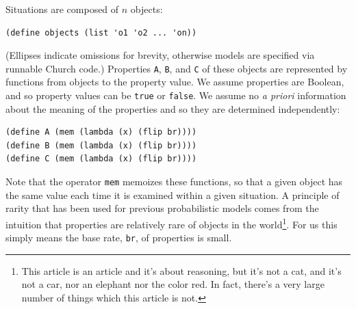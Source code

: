 \documentclass[10pt,letterpaper]{article}
\begin{document}
Situations are composed of $n$ objects:
\begin{lstlisting}
(define objects (list 'o1 'o2 ... 'on))
\end{lstlisting}
(Ellipses indicate omissions for brevity, otherwise models are specified via runnable Church code.)
Properties \lstinline{A}, \lstinline{B}, and \lstinline{C} of these objects are represented by functions from objects to the property value. We assume properties are Boolean, and so property values can be \lstinline{true} or \lstinline{false}. We assume no \emph{a priori} information about the meaning of the properties and so they are determined independently:
\begin{lstlisting}
(define A (mem (lambda (x) (flip br))))
(define B (mem (lambda (x) (flip br))))
(define C (mem (lambda (x) (flip br))))
\end{lstlisting}
Note that the operator \lstinline{mem} memoizes these functions, so that a given object has the same value each time it is examined within a given situation. 
A principle of rarity that has been used for previous probabilistic models \cite{Oaksford1994} comes from the intuition that properties are relatively rare of objects in the world\footnote{This article is an article and it's about reasoning, but it's not a cat, and it's not a car, nor an elephant nor the color red. In fact, there's a very large number of things which this article is not.}. For us this simply means the base rate, \lstinline{br}, of properties is small.  

%
\end{document}
